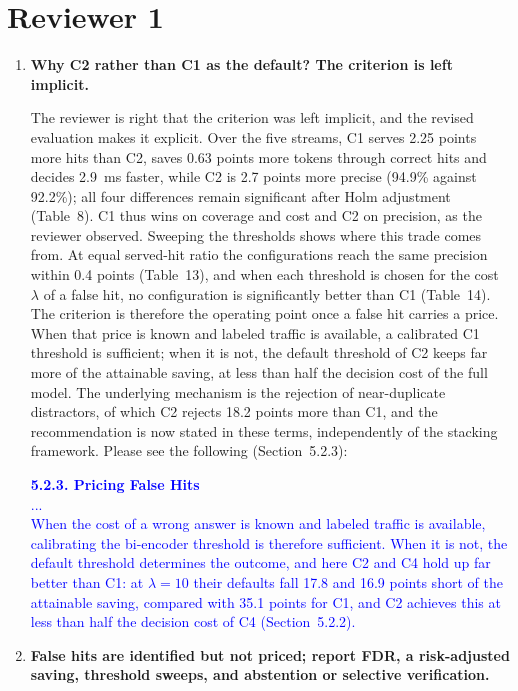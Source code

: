 \documentclass[11pt]{article}
\begin{document}
\section*{Reviewer 1}

\begin{enumerate}[leftmargin=*, itemsep=1.2em]

\item \textbf{Why C2 rather than C1 as the default? The criterion is left implicit.}

The reviewer is right that the criterion was left implicit, and the revised evaluation makes it explicit. Over the five streams, C1 serves 2.25 points more hits than C2, saves 0.63 points more tokens through correct hits and decides 2.9~ms faster, while C2 is 2.7 points more precise (94.9\% against 92.2\%); all four differences remain significant after Holm adjustment (Table~8). C1 thus wins on coverage and cost and C2 on precision, as the reviewer observed. Sweeping the thresholds shows where this trade comes from. At equal served-hit ratio the configurations reach the same precision within 0.4 points (Table~13), and when each threshold is chosen for the cost $\lambda$ of a false hit, no configuration is significantly better than C1 (Table~14). The criterion is therefore the operating point once a false hit carries a price. When that price is known and labeled traffic is available, a calibrated C1 threshold is sufficient; when it is not, the default threshold of C2 keeps far more of the attainable saving, at less than half the decision cost of the full model. The underlying mechanism is the rejection of near-duplicate distractors, of which C2 rejects 18.2 points more than C1, and the recommendation is now stated in these terms, independently of the stacking framework. Please see the following (Section~5.2.3):

\textcolor{blue}{\textbf{5.2.3. Pricing False Hits}\\
...\\
When the cost of a wrong answer is known and labeled traffic is available, calibrating the bi-encoder threshold is therefore sufficient. When it is not, the default threshold determines the outcome, and here C2 and C4 hold up far better than C1: at $\lambda=10$ their defaults fall 17.8 and 16.9 points short of the attainable saving, compared with 35.1 points for C1, and C2 achieves this at less than half the decision cost of C4 (Section~5.2.2).}

\item \textbf{False hits are identified but not priced; report FDR, a risk-adjusted saving, threshold sweeps, and abstention or selective verification.}


\end{enumerate}
\end{document}
